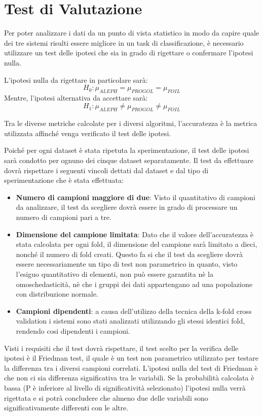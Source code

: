\section{Test di Valutazione}
\nocite{friedmanTest}
\nocite{wiki:Friedman}
Per poter analizzare i dati da un punto di vista statistico in modo da capire quale dei tre sistemi risulti essere migliore in un task di classificazione, è necessario utilizzare un test delle ipotesi che sia in grado di rigettare o confermare l'ipotesi nulla.

L'ipotesi nulla da rigettare in particolare sarà:
$$H_0 : \mu_{ALEPH} = \mu_{PROGOL} = \mu_{FOIL} $$
Mentre, l'ipotesi alternativa da accettare sarà:
$$H_1 : \mu_{ALEPH} \neq \mu_{PROGOL} \neq \mu_{FOIL} $$

Tra le diverse metriche calcolate per i diversi algoritmi, l'accuratezza è la metrica utilizzata affinché venga verificato il test delle ipotesi.

Poiché per ogni dataset è stata ripetuta la sperimentazione, il test delle ipotesi sarà condotto per ognuno dei cinque dataset separatamente.
Il test da effettuare dovrà rispettare i seguenti vincoli dettati dal dataset e dal tipo di sperimentazione che è stata effettuata:
\begin{itemize}
	\item \textbf{Numero di campioni maggiore di due}: Visto il quantitativo di campioni da analizzare, il test da scegliere dovrà essere in grado di processare un numero di campioni pari a tre.
	\item \textbf{Dimensione del campione limitata}: Dato che il valore dell'accuratezza è stata calcolata per ogni fold, il dimensione del campione sarà limitato a dieci, nonché il numero di fold creati. Questo fa si che il test da scegliere dovrà essere necessariamente un tipo di test non parametrico in quanto, visto l'esiguo quantitativo di elementi, non può essere garantita nè la omoschedasticità, nè che i gruppi dei dati appartengano ad una popolazione con distribuzione normale.
	\item \textbf{Campioni dipendenti}: a causa dell'utilizzo della tecnica della k-fold cross validation i sistemi sono stati analizzati utilizzando gli stessi identici fold, rendendo cosi dipendenti i campioni.
\end{itemize}

Visti i requisiti che il test dovrà rispettare, il test scelto per la verifica delle ipotesi è il Friedman test, il quale è un test non parametrico utilizzato per testare la differenza tra i diversi campioni correlati.
L'ipotesi nulla del test di Friedman è che non ci sia differenza significativa tra le variabili. Se la probabilità calcolata è bassa (P è inferiore al livello di significatività selezionato) l'ipotesi nulla verrà rigettata e si potrà concludere che almeno due delle variabili sono significativamente differenti con le altre.

